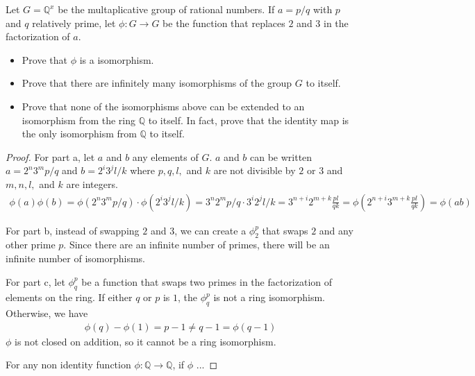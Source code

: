 \documentclass[10pt]{article}
\newenvironment{problem}[2][Problem]{\begin{trivlist}
		\item[\hskip \labelsep {\bfseries #1}\hskip \labelsep {\bfseries #2.}]}{\end{trivlist}}
\begin{document}
		
		\begin{problem}{3.1}
			Let $G=\mathbb{Q}^{x}$ be the multaplicative group of rational numbers. If $a=p/q$ with $p$ and $q$ relatively prime, let $\phi:G \rightarrow G$ be the function that replaces $2$ and $3$ in the factorization of $a$.
			\begin{itemize}
				\item[(a)] Prove that $\phi$ is a isomorphism.
				\item[(b)] Prove that there are infinitely many isomorphisms of the group $G$ to itself.
				\item[(c)] Prove that none of the isomorphisms above can be extended to an isomorphism from the ring $\mathbb{Q}$ to itself. In fact, prove that the identity map is the only isomorphism from $\mathbb{Q}$ to itself.
			\end{itemize} 
			\begin{proof}
				For part a, let $a$ and $b$ any elements of $G$. $a$ and $b$ can be written $a=2^{n}3^{m}p/q$ and $b=2^{i}3^{j}l/k$ where $p,q,l,$ and $k$ are not divisible by $2$ or $3$ and $m,n,l,$ and $k$ are integers.
				\begin{align}
					 \phi(a)\phi(b) = \phi(2^{n}3^{m}p/q) \cdot \phi(2^{i}3^{j}l/k) = 3^{n}2^{m}p/q \cdot 3^{i}2^{j}l/k = 3^{n+i}2^{m+k} \frac{pl}{qk} = \phi(2^{n+i}3^{m+k} \frac{pl}{qk}) = \phi(ab)
				\end{align}
				
				For part b, instead of swapping $2$ and $3$, we can create a $\phi_{2}^{p}$ that swaps $2$ and any other prime $p$. Since there are an infinite number of primes, there will be an infinite number of isomorphisms.
				
				For part c, let $\phi_{q}^{p}$ be a function that swaps two primes in the factorization of elements on the ring. If either $q$ or $p$ is $1$, the $\phi_{q}^{p}$ is not a ring isomorphism. Otherwise, we have
				\begin{align}
					\phi(q) - \phi(1) = p - 1 \not = q-1 = \phi(q-1)
				\end{align}
				$\phi$ is not closed on addition, so it cannot be a ring isomorphism. 
				
				For any non identity function $\phi : \mathbb{Q} \rightarrow \mathbb{Q}$, if $\phi$ ...
			\end{proof}
		\end{problem}
		
\end{document}
